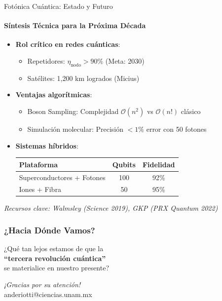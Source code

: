 \documentclass{beamer}
\begin{document}
\begin{frame}{Fotónica Cuántica: Estado y Futuro}
\framesubtitle{Síntesis Técnica para la Próxima Década}

\begin{itemize}
    \item \textbf{Rol crítico en redes cuánticas}:
    \begin{itemize}
        \item Repetidores: $\eta_{\text{nodo}} > 90\%$ (Meta: 2030)
        \item Satélites: 1,200 km logrados (Micius)
    \end{itemize}
    
    \item \textbf{Ventajas algorítmicas}:
    \begin{itemize}
        \item Boson Sampling: Complejidad $\mathcal{O}(n^2)$ vs $\mathcal{O}(n!)$ clásico
        \item Simulación molecular: Precisión $<1\%$ error con 50 fotones
    \end{itemize}
    
    \item \textbf{Sistemas híbridos}:
    \begin{table}[h]
    \centering
    \begin{tabular}{lcc}
    \toprule
    Plataforma & Qubits & Fidelidad \\
    \midrule
    Superconductores + Fotones & 100 & 92\% \\
    Iones + Fibra & 50 & 95\% \\
    \bottomrule
    \end{tabular}
    \end{table}
\end{itemize}

\vspace{5pt}
\centering
\footnotesize \emph{Recursos clave: Walmsley (Science 2019), GKP (PRX Quantum 2022)}
\end{frame}

\begin{frame}
\frametitle{¿Hacia Dónde Vamos?}
\vspace{1cm}

\begin{center}
\Large ¿Qué tan lejos estamos de que la\\ \textbf{``tercera revolución cuántica''}\\ se materialice en nuestro presente?  

\vspace{1cm}

\emph{¡Gracias por su atención!}  \\
\footnotesize anderiotti@ciencias.unam.mx  
\end{center}
\end{frame}
\end{document}

